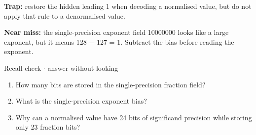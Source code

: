 \documentclass[11pt]{article}
\begin{document}
\begin{keepsection}
\begin{keepsection}
\begin{notebox}\textbf{Trap:} restore the hidden leading 1 when decoding a normalised value, but do not apply that rule to a denormalised value.\end{notebox}

\begin{notebox}\textbf{Near miss:} the single-precision exponent field 10000000 looks like a large exponent, but it means 128 \ensuremath{-} 127 = 1. Subtract the bias before reading the exponent.\end{notebox}

\begin{recallbox}{Recall check \ensuremath{\cdot} answer without looking}
\begin{enumerate}
\item How many bits are stored in the single-precision fraction field?
\item What is the single-precision exponent bias?
\item Why can a normalised value have 24 bits of significand precision while storing only 23 fraction bits?
\end{enumerate}

\end{recallbox}
\end{keepsection}
\end{keepsection}
\end{document}
